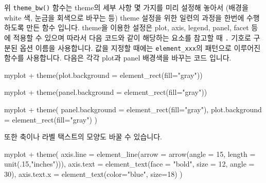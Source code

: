 \documentclass[
]{book}
\newenvironment{Shaded}{\begin{snugshade}}{\end{snugshade}}
\newcommand{\AttributeTok}[1]{\textcolor[rgb]{0.77,0.63,0.00}{#1}}
\newcommand{\DecValTok}[1]{\textcolor[rgb]{0.00,0.00,0.81}{#1}}
\newcommand{\FunctionTok}[1]{\textcolor[rgb]{0.00,0.00,0.00}{#1}}
\newcommand{\NormalTok}[1]{#1}
\newcommand{\SpecialCharTok}[1]{\textcolor[rgb]{0.00,0.00,0.00}{#1}}
\newcommand{\StringTok}[1]{\textcolor[rgb]{0.31,0.60,0.02}{#1}}
\begin{document}
위 \texttt{theme\_bw()} 함수는 theme의 세부 사항 몇 가지를 미리 설정해 놓아서 (배경을 white 색, 눈금을 회색으로 바꾸는 등) theme 설정을 위한 일련의 과정을 한번에 수행하도록 만든 함수 입니다. theme을 이용한 설정은 plot, axis, legend, panel, facet 등에 적용할 수 있으며 따라서 다음 코드와 같이 해당하는 요소를 참고할 때 \texttt{.} 기호로 구분된 옵션 이름을 사용합니다. 값을 지정할 때에는 \texttt{element\_xxx}의 패턴으로 이루어진 함수를 사용합니다. 다음은 각각 plot과 panel 배경색을 바꾸는 코드 입니다.

\begin{Shaded}
\begin{Highlighting}[]
\NormalTok{myplot }\SpecialCharTok{+} \FunctionTok{theme}\NormalTok{(}\AttributeTok{plot.background =} \FunctionTok{element\_rect}\NormalTok{(}\AttributeTok{fill=}\StringTok{"gray"}\NormalTok{))}
\end{Highlighting}
\end{Shaded}

\begin{Shaded}
\begin{Highlighting}[]
\NormalTok{myplot }\SpecialCharTok{+} \FunctionTok{theme}\NormalTok{(}\AttributeTok{panel.background =} \FunctionTok{element\_rect}\NormalTok{(}\AttributeTok{fill=}\StringTok{"gray"}\NormalTok{))}
\end{Highlighting}
\end{Shaded}

\begin{Shaded}
\begin{Highlighting}[]
\NormalTok{myplot }\SpecialCharTok{+} 
  \FunctionTok{theme}\NormalTok{(}
    \AttributeTok{panel.background =} \FunctionTok{element\_rect}\NormalTok{(}\AttributeTok{fill=}\StringTok{"gray"}\NormalTok{),}
    \AttributeTok{plot.background =} \FunctionTok{element\_rect}\NormalTok{(}\AttributeTok{fill=}\StringTok{"gray"}\NormalTok{)}
\NormalTok{    )}
\end{Highlighting}
\end{Shaded}

또한 축이나 라벨 택스트의 모양도 바꿀 수 있습니다.

\begin{Shaded}
\begin{Highlighting}[]
\NormalTok{myplot }\SpecialCharTok{+} 
  \FunctionTok{theme}\NormalTok{(}
    \AttributeTok{axis.line =} \FunctionTok{element\_line}\NormalTok{(}\AttributeTok{arrow =} \FunctionTok{arrow}\NormalTok{(}\AttributeTok{angle =} \DecValTok{15}\NormalTok{, }\AttributeTok{length =} \FunctionTok{unit}\NormalTok{(.}\DecValTok{15}\NormalTok{,}\StringTok{"inches"}\NormalTok{))),}
    \AttributeTok{axis.text =} \FunctionTok{element\_text}\NormalTok{(}\AttributeTok{face =} \StringTok{"bold"}\NormalTok{, }\AttributeTok{size =} \DecValTok{12}\NormalTok{, }\AttributeTok{angle =} \DecValTok{30}\NormalTok{),}
    \AttributeTok{axis.text.x =} \FunctionTok{element\_text}\NormalTok{(}\AttributeTok{color=}\StringTok{"blue"}\NormalTok{, }\AttributeTok{size=}\DecValTok{18}\NormalTok{)}
\NormalTok{    )}
\end{Highlighting}
\end{Shaded}
\end{document}
